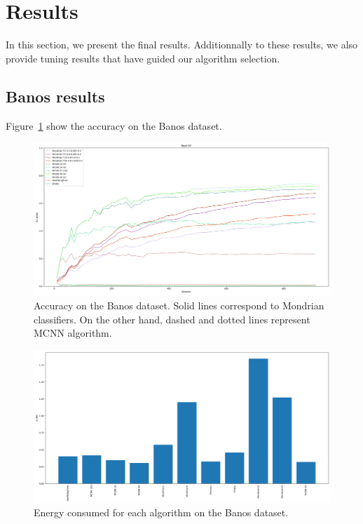 \section{Results}
In this section, we present the final results. Additionnally to these results,
we also provide tuning results that have guided our algorithm selection.

\subsection{Banos results}
Figure~\ref{fig:best-of-accuracy} show the accuracy on the Banos dataset.

\begin{figure}[H]
	\includegraphics[width=\linewidth]{figures/Banos_S1_shuf_Best_of.png}
	\caption{Accuracy on the Banos dataset. Solid lines correspond to Mondrian classifiers. On the other hand, dashed and dotted lines represent MCNN algorithm.}
	\label{fig:best-of-accuracy}
\end{figure}
\begin{figure}[H]
	\includegraphics[width=\linewidth]{figures/energy.png}
	\caption{Energy consumed for each algorithm on the Banos dataset.}
\end{figure}
